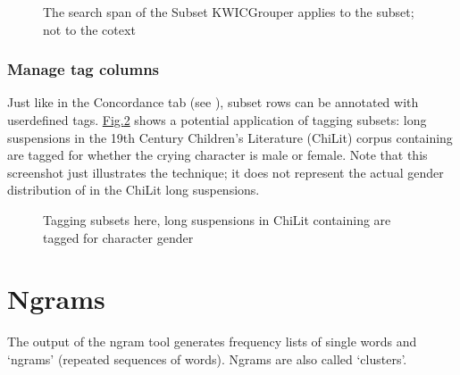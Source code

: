 \documentclass[letterpaper,10pt,english]{sphinxmanual}
\begin{document}
\begin{figure}[htbp]
\centering
\capstart

\noindent{}
\caption{The search span of the Subset KWICGrouper applies to the
subset; not to the co\sphinxhyphen{}text}\label{\detokenize{clicanalysis/subsets:id7}}\label{\detokenize{clicanalysis/subsets:figure-analysis-subsets-kwicgrouper-criedscreamedsobbed}}\end{figure}


\subsection{Manage tag columns}
\label{\detokenize{clicanalysis/subsets:manage-tag-columns}}
\sphinxAtStartPar
Just like in the Concordance tab (see {\hyperref[\detokenize{clicanalysis/concordance:concordance}]{}}), subset rows can be
annotated with user\sphinxhyphen{}defined tags.
\hyperref[\detokenize{clicanalysis/subsets:figure-analysis-subsets-tagcolumns-gender}]{Fig.\@ \ref{\detokenize{clicanalysis/subsets:figure-analysis-subsets-tagcolumns-gender}}} shows a
potential application of tagging subsets: long suspensions in the 19th
Century Children’s Literature (ChiLit) corpus containing  are
tagged for whether the crying character is male or female. Note that
this screenshot just illustrates the technique; it does not represent
the actual gender distribution of  in the ChiLit long
suspensions.

\begin{figure}[htbp]
\centering
\capstart

\noindent{}
\caption{Tagging subsets \textendash{} here, long suspensions in ChiLit
containing  are tagged for character gender}\label{\detokenize{clicanalysis/subsets:id8}}\label{\detokenize{clicanalysis/subsets:figure-analysis-subsets-tagcolumns-gender}}\end{figure}

\sphinxstepscope


\chapter{N\sphinxhyphen{}grams}
\label{\detokenize{clicanalysis/ngrams:n-grams}}\label{\detokenize{clicanalysis/ngrams:ngrams}}\label{\detokenize{clicanalysis/ngrams::doc}}
\sphinxAtStartPar
The output of the n\sphinxhyphen{}gram tool generates frequency lists of single words
and ‘n\sphinxhyphen{}grams’ (repeated sequences of words). N\sphinxhyphen{}grams are also called
‘clusters’.
\end{document}
